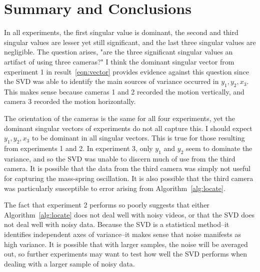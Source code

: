 \documentclass{article}
\begin{document}
\section{Summary and Conclusions}

In all experiments, the first singular value is dominant, the second and third singular values are lesser yet still significant, and the last three singular values are negligible. The question arises, "are the three significant singular values an artifact of using three cameras?" I think the dominant singular vector from experiment 1 in result~\ref{eqn:vector} provides evidence against this question since the SVD was able to identify the main sources of variance occurred in $y_1, y_2, x_3$. This makes sense because cameras 1 and 2 recorded the motion vertically, and camera 3 recorded the motion horizontally.

The orientation of the cameras is the same for all four experiments, yet the dominant singular vectors of experiments do not all capture this. I should expect $y_1,y_2,x_3$ to be dominant in all singular vectors. This is true for those resulting from experiments 1 and 2. In experiment 3, only $y_1$ and $y_2$ seem to dominate the variance, and so the SVD was unable to discern much of use from the third camera. It is possible that the data from the third camera was simply not useful for capturing the mass-spring oscillation. It is also possible that the third camera was particularly susceptible to error arising from Algorithm~\ref{alg:locate}.

The fact that experiment 2 performs so poorly suggests that either Algorithm~\ref{alg:locate} does not deal well with noisy videos, or that the SVD does not deal well with noisy data. Because the SVD is a statistical method--it identifies independent axes of variance--it makes sense that noise manifests as high variance. It is possible that with larger samples, the noise will be averaged out, so further experiments may want to test how well the SVD performs when dealing with a larger sample of noisy data.
\end{document}
